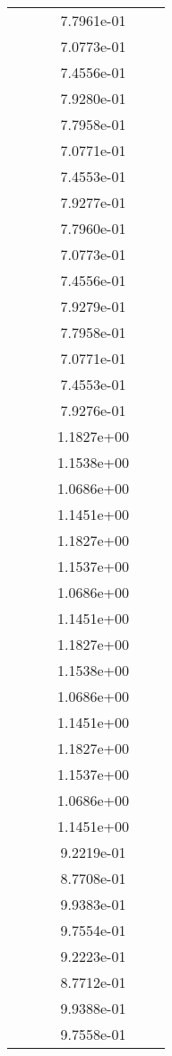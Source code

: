 \begin{xltabular}{\textwidth}{r|rS[table-format=1.3e+2]S[table-format=1.4e+2]S[table-format=1.4e+2]S[table-format=-1.5]}
&  &  & 7.7961e-01 & & \\
&  &  & 7.0773e-01 & & \\
&  &  & 7.4556e-01 & & \\
&  &  & 7.9280e-01 & & \\
&  &  & 7.7958e-01 & & \\
&  &  & 7.0771e-01 & & \\
&  &  & 7.4553e-01 & & \\
&  &  & 7.9277e-01 & & \\
&  &  & 7.7960e-01 & & \\
&  &  & 7.0773e-01 & & \\
&  &  & 7.4556e-01 & & \\
&  &  & 7.9279e-01 & & \\
&  &  & 7.7958e-01 & & \\
&  &  & 7.0771e-01 & & \\
&  &  & 7.4553e-01 & & \\
&  &  & 7.9276e-01 & & \\
&  &  & 1.1827e+00 & & \\
&  &  & 1.1538e+00 & & \\
&  &  & 1.0686e+00 & & \\
&  &  & 1.1451e+00 & & \\
&  &  & 1.1827e+00 & & \\
&  &  & 1.1537e+00 & & \\
&  &  & 1.0686e+00 & & \\
&  &  & 1.1451e+00 & & \\
&  &  & 1.1827e+00 & & \\
&  &  & 1.1538e+00 & & \\
&  &  & 1.0686e+00 & & \\
&  &  & 1.1451e+00 & & \\
&  &  & 1.1827e+00 & & \\
&  &  & 1.1537e+00 & & \\
&  &  & 1.0686e+00 & & \\
&  &  & 1.1451e+00 & & \\
&  &  & 9.2219e-01 & & \\
&  &  & 8.7708e-01 & & \\
&  &  & 9.9383e-01 & & \\
&  &  & 9.7554e-01 & & \\
&  &  & 9.2223e-01 & & \\
&  &  & 8.7712e-01 & & \\
&  &  & 9.9388e-01 & & \\
&  &  & 9.7558e-01 & & \\

\end{xltabular}
